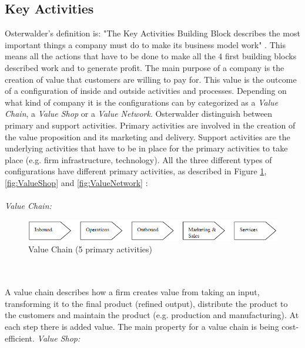 \subsection{Key Activities}
Osterwalder’s definition is: "The Key Activities Building Block describes the most important things a company must do to make its business model work" \cite{osterwalder}. This means all the actions that have to be done to make all the 4 first building blocks described work and to generate profit. The main purpose of a company is the creation of value that customers are willing to pay for. This value is the outcome of a configuration of inside and outside activities and processes. Depending on what kind of company it is the configurations can by categorized as a \emph{Value Chain}, a \emph{Value Shop} or a \emph{Value Network}. Osterwalder distinguish between primary and support activities. Primary activities are involved in the creation of the value proposition and its marketing and delivery. Support activities are the underlying activities that have to be in place for the primary activities to take place (e.g. firm infrastructure, technology). All the three different types of configurations have different primary activities, as described in Figure \ref{fig:ValueChain}, \ref{fig:ValueShop} and \ref{fig:ValueNetwork} \cite{osterwalderthesis}:\\ \\
\emph{Value Chain:}
\begin{figure}[h]
\centering
\begin{center}
\includegraphics[scale=0.6]{valuechainnew}
\caption[Value Chain]{Value Chain (5 primary activities) \cite{osterwalderthesis}}
\label{fig:ValueChain}
\end{center}
\end{figure} \\ \\
A value chain describes how a firm creates value from taking an input, transforming it to the final product (refined output), distribute the product  to the customers and maintain the product (e.g. production and manufacturing). At each step there is added value. The main property for a value chain is being cost-efficient.
\newpage
\emph{Value Shop:}
